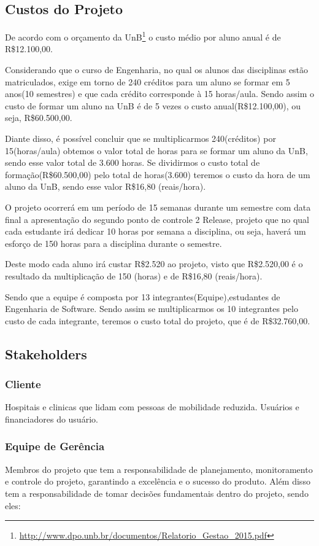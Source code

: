 \subsection{Custos do Projeto}
De acordo com o orçamento da
UnB\footnote{\url{http://www.dpo.unb.br/documentos/Relatorio_Gestao_2015.pdf}}
o custo médio por aluno anual é de R\$12.100,00.

Considerando que o curso de Engenharia, no qual os alunos das 
disciplinas estão matriculados, exige em torno de 240 créditos para um aluno se formar em 
5 anos(10 semestres) e que cada crédito corresponde à 15 
horas/aula. Sendo assim o custo de formar um aluno na UnB é de 5 
vezes o custo anual(R\$12.100,00), ou seja, R\$60.500,00.

Diante disso, é possível concluir que se multiplicarmos 240(créditos) por 
15(horas/aula) obtemos o valor total de horas para se formar um aluno da UnB,
sendo esse valor total de 3.600 horas. Se dividirmos o custo total de 
formação(R\$60.500,00) pelo total de horas(3.600) teremos o custo da hora 
de um aluno da UnB, sendo esse valor R\$16,80 (reais/hora).

O projeto ocorrerá em um período de 15 semanas durante um semestre com data 
final a apresentação do segundo ponto de controle 2 Release, projeto que no qual cada estudante irá 
dedicar 10 horas por semana a disciplina, ou seja, haverá um esforço de 150 
horas para a disciplina durante o semestre.

Deste modo cada aluno irá custar R\$2.520 ao projeto, visto que R\$2.520,00 é o 
resultado da multiplicação de 150 (horas) e de R\$16,80 (reais/hora).

Sendo que a equipe é composta por 13 integrantes(Equipe),estudantes de 
Engenharia de Software. Sendo assim se multiplicarmos os 10 integrantes pelo 
custo de cada integrante, teremos o custo total do projeto, que é de 
R\$32.760,00.

\subsection{Stakeholders}

\subsubsection{Cliente}
Hospitais e clinicas que lidam com pessoas de mobilidade reduzida. Usuários e financiadores do usuário.

\subsubsection{Equipe de Gerência}
Membros do projeto que tem a responsabilidade de planejamento, monitoramento 
e controle do projeto, garantindo a excelência e o sucesso do produto. Além 
disso tem a responsabilidade de tomar decisões fundamentais dentro do projeto, 
sendo eles:

